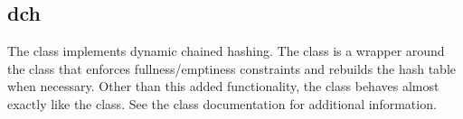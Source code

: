 %
%
%
%
%

\subsection{dch}
\label{dch}

The  class implements dynamic chained hashing.  The
 class is a wrapper around the  class that enforces
fullness/emptiness constraints and rebuilds the hash table when necessary.
Other than this added functionality, the  class behaves almost
exactly like the  class.  See the 
class documentation for additional information.

